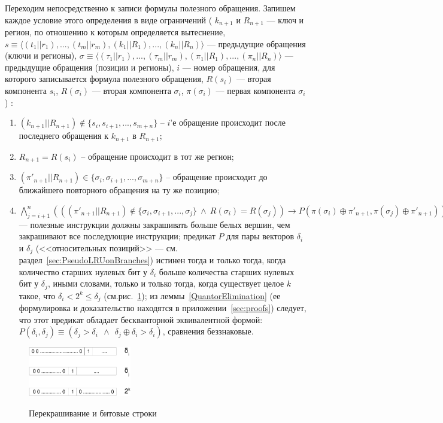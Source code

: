 \begin{enumerate}
Переходим непосредственно к записи формулы полезного обращения. Запишем каждое условие этого определения в виде ограничений ( $k_{n+1}$ и $R_{n+1}$ --- ключ и регион, по отношению к которым определяется вытеснение, $s \equiv \langle (t_1||r_1), ..., (t_m||r_m), (k_1||R_1), ..., (k_n||R_n)\rangle$ --- предыдущие обращения (ключи и регионы), $\sigma \equiv \langle (\tau_1||r_1), ..., (\tau_m||r_m), (\pi_1||R_1), ..., (\pi_n||R_n)\rangle$ --- предыдущие обращения (позиции и регионы), $i$ --- номер обращения, для которого записывается формула полезного обращения, $R(s_i)$ --- вторая компонента $s_i$, $R(\sigma_i)$ --- вторая компонента $\sigma_i$, $\pi(\sigma_i)$ --- первая компонента $\sigma_i$) :
\begin{enumerate}
    \item $(k_{n+1}||R_{n+1}) \notin \{s_i, s_{i+1}, ...,  s_{m+n}\}$ -- $i$'е обращение происходит после последнего обращения к $k_{n+1}$ в $R_{n+1}$;
    \item $R_{n+1} = R(s_i)$ -- обращение происходит в тот же регион;
    \item $(\pi'_{n+1}||R_{n+1}) \in \{\sigma_i, \sigma_{i+1}, ..., \sigma_{m+n}\}$ -- обращение происходит до ближайшего повторного обращения на ту же позицию;
    \item $\bigwedge\limits_{j = i+1}^n (((\pi'_{n+1}||R_{n+1}) \notin \{\sigma_i, \sigma_{i+1}, ..., \sigma_j\}~\wedge~R(\sigma_i) = R(\sigma_j)) \rightarrow P(\pi(\sigma_i) \oplus \pi'_{n+1}, \pi(\sigma_j) \oplus \pi'_{n+1}))$ --- полезные инструкции должны закрашивать больше белых вершин, чем закрашивают все последующие инструкции;  предикат $P$ для пары векторов $\delta_i$ и $\delta_j$ (<<относительных позиций>> --- см. раздел~\ref{sec:PseudoLRUonBranches}) истинен тогда и только тогда, когда количество старших нулевых бит у $\delta_i$ больше количества старших нулевых бит у $\delta_j$, иными словами, только и только тогда, когда существует целое $k$ такое, что $\delta_i < 2^k \leqslant \delta_j$ (см.рис.~\ref{fig:bits}); из леммы~\ref{QuantorElimination} (ее формулировка и доказательство находятся в приложении~\ref{sec:proofs}) следует, что этот предикат обладает бескванторной эквивалентной формой: $P(\delta_i, \delta_j) \equiv (\delta_j > \delta_i~~\wedge~~\delta_j \oplus \delta_i > \delta_i)$, сравнения беззнаковые.
\end{enumerate}

\begin{figure}[h] \center
  \includegraphics[width=0.4\textwidth]{2.theor/bits}\\
  \caption{Перекрашивание и битовые строки}\label{fig:bits}
\end{figure}


\end{enumerate}
